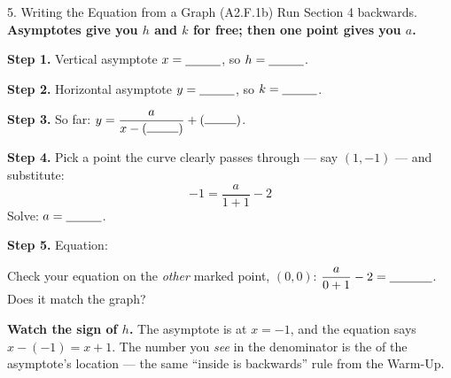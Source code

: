 \documentclass[10pt]{article}
\newcommand{\lgrid}[4]{%
  \draw[step=1, linegray!40, very thin] (#1,#3) grid (#2,#4);
  \draw[->, semithick, charcoal] (#1,0)--(#2,0) node[below right, font=\scriptsize]{$x$};
  \draw[->, semithick, charcoal] (0,#3)--(0,#4) node[left, font=\scriptsize]{$y$};}
\begin{document}
\begin{notesbox}{5. Writing the Equation from a Graph (A2.F.1b)}
Run Section 4 backwards. \textbf{Asymptotes give you $h$ and $k$ for free; then one point gives you $a$.}
\begin{center}
\begin{minipage}{0.50\linewidth}\centering
{}
\end{minipage}%
\begin{minipage}{0.48\linewidth}
\small
\textbf{Step 1.} Vertical asymptote $x=\blank{1.0cm}$, so $h=\blank{1.0cm}$.

\vspace{3pt}
\textbf{Step 2.} Horizontal asymptote $y=\blank{1.0cm}$, so $k=\blank{1.0cm}$.

\vspace{3pt}
\textbf{Step 3.} So far: $y=\dfrac{a}{x-(\rule{0.9cm}{0.4pt})}+(\rule{0.9cm}{0.4pt})$.

\vspace{3pt}
\textbf{Step 4.} Pick a point the curve clearly passes through --- say $(1,-1)$ --- and substitute:
\[ -1=\frac{a}{1+1}-2 \]
Solve: $a=\blank{1.0cm}$.

\vspace{3pt}
\textbf{Step 5.} Equation: \blank{3.0cm}
\end{minipage}
\end{center}
\vspace{2pt}
Check your equation on the \emph{other} marked point, $(0,0)$: \; $\dfrac{a}{0+1}-2=\blank{1.2cm}$.
\; Does it match the graph? \blank{1.0cm}

\vspace{3pt}
\textbf{Watch the sign of $h$.} The asymptote is at $x=-1$, and the equation says $x-(-1)=x+1$. The
number you \emph{see} in the denominator is the \blank{2.0cm} of the asymptote's location --- the same
``inside is backwards'' rule from the Warm-Up.
\end{notesbox}
\end{document}
